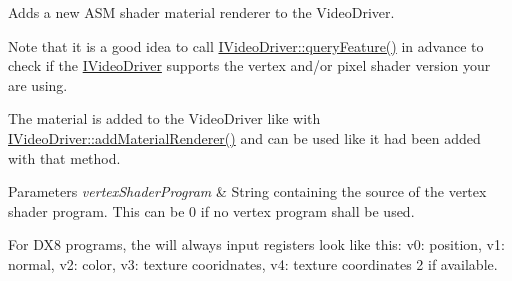 Adds a new A\+SM shader material renderer to the Video\+Driver. 

Note that it is a good idea to call \hyperlink{classirr_1_1video_1_1IVideoDriver_adde468368b77441ada246e1603da4f47}{I\+Video\+Driver\+::query\+Feature()} in advance to check if the \hyperlink{classirr_1_1video_1_1IVideoDriver}{I\+Video\+Driver} supports the vertex and/or pixel shader version your are using.

The material is added to the Video\+Driver like with \hyperlink{classirr_1_1video_1_1IVideoDriver_a0dfc3a7168f3a73a6f4323b579f03ff6}{I\+Video\+Driver\+::add\+Material\+Renderer()} and can be used like it had been added with that method. 
\begin{DoxyParams}{Parameters}
{\em vertex\+Shader\+Program} & String containing the source of the vertex shader program. This can be 0 if no vertex program shall be used.\\
\hline
\end{DoxyParams}
For D\+X8 programs, the will always input registers look like this\+: v0\+: position, v1\+: normal, v2\+: color, v3\+: texture cooridnates, v4\+: texture coordinates 2 if available.


